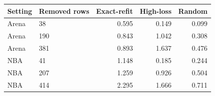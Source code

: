 \begin{tabular}{llrrr}
\toprule
Setting & Removed rows & Exact-refit & High-loss & Random \\
\midrule
Arena & 38 & 0.595 & 0.149 & 0.099 \\
Arena & 190 & 0.843 & 1.042 & 0.308 \\
Arena & 381 & 0.893 & 1.637 & 0.476 \\
NBA & 41 & 1.148 & 0.185 & 0.244 \\
NBA & 207 & 1.259 & 0.926 & 0.504 \\
NBA & 414 & 2.295 & 1.666 & 0.711 \\
\bottomrule
\end{tabular}